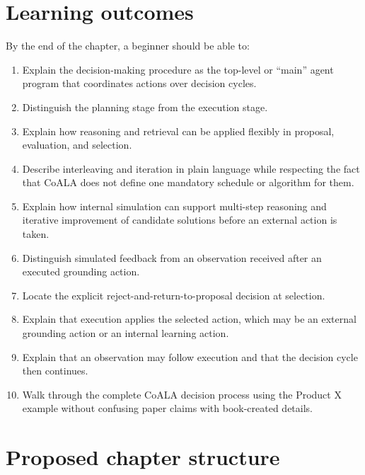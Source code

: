 \section{Learning outcomes}
By the end of the chapter, a beginner should be able to:
\begin{enumerate}
  \item Explain the decision-making procedure as the top-level or ``main'' agent program that coordinates actions over decision cycles.
  \item Distinguish the planning stage from the execution stage.
  \item Explain how reasoning and retrieval can be applied flexibly in proposal, evaluation, and selection.
  \item Describe interleaving and iteration in plain language while respecting the fact that CoALA does not define one mandatory schedule or algorithm for them.
  \item Explain how internal simulation can support multi-step reasoning and iterative improvement of candidate solutions before an external action is taken.
  \item Distinguish simulated feedback from an observation received after an executed grounding action.
  \item Locate the explicit reject-and-return-to-proposal decision at selection.
  \item Explain that execution applies the selected action, which may be an external grounding action or an internal learning action.
  \item Explain that an observation may follow execution and that the decision cycle then continues.
  \item Walk through the complete CoALA decision process using the Product X example without confusing paper claims with book-created details.
\end{enumerate}

\section*{Proposed chapter structure}

